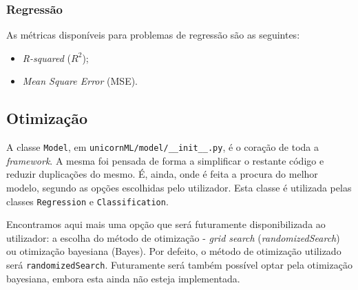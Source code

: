 \documentclass[a4paper]{report}
\begin{document}
{            \subsubsection{Regressão} \label{sssec:Regression2}
			As métricas disponíveis para problemas de regressão são as seguintes:
			\begin{itemize}
				\item \textit{R-squared} ($R^{2}$);
				\item \textit{Mean Square Error} (MSE).
			\end{itemize}

		\subsection{Otimização} \label{subsec:Optimization}
		A classe \texttt{Model}, em \texttt{unicornML/model/\_\_init\_\_.py}, é o coração de toda a \textit{framework}.
		A mesma foi pensada de forma a simplificar o restante código e reduzir duplicações do mesmo. 
		É, ainda, onde é feita a procura do melhor modelo, segundo as opções escolhidas pelo utilizador.
		Esta classe é utilizada pelas classes \texttt{Regression} e \texttt{Classification}.
		
		Encontramos aqui mais uma opção que será futuramente disponibilizada ao utilizador: a escolha do método de otimização - \textit{grid search} (\textit{randomizedSearch}) ou otimização bayesiana (Bayes).
		Por defeito, o método de otimização utilizado será \texttt{randomizedSearch}. Futuramente será também possível optar pela otimização bayesiana, embora esta ainda não esteja implementada.
}
\end{document}
